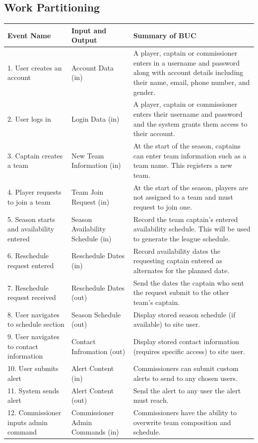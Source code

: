 \documentclass[12pt]{article}
\begin{document}
\subsection{Work Partitioning}
  \begin{center}
    \begin{tabular}{|m{4cm}|m{4cm}|m{6cm}|}
      \hline
      Event Name & Input and Output & Summary of BUC\\
      \hline
      1. User creates an account & Account Data (in) & A player, captain or
      commissioner enters in a username and password along with account details
      including their name, email, phone number, and gender.\\
      2. User logs in & Login Data (in) & A player, captain or commissioner
      enters their username and password and the system grants them access to
      their account.\\
      3. Captain creates a team & New Team Information (in) & At the
      start of the season, captains can enter team information such as a team
      name. This registers a new team.\\
      4. Player requests to join a team & Team Join Request (in) & At the
      start of the season, players are not assigned to a team and must request
      to join one.\\
      5. Season starts and availability entered & Season Availability Schedule
      (in) & Record the team captain's entered availability schedule. This
      will be used to generate the league schedule.\\
      6. Reschedule request entered & Reschedule Dates (in) & Record
      availability dates the requesting captain entered as alternates for the
      planned date.\\
      7. Reschedule request received & Reschedule Dates (out) & Send the dates
      the captain who sent the request submit to the other team's captain.\\
      8. User navigates to schedule section & Season Schedule (out) & Display
      stored season schedule (if available) to site user.\\
      9. User navigates to contact information & Contact Infromation (out) & Display
      stored contact information (requires specific access) to site user.\\
      10. User submits alert & Alert Content (in) & Commissioners can submit custom
      alerts to send to any chosen users.\\
      11. System sends alert & Alert Content (out) & Send the alert to any user the
      alert must reach.\\
      12. Commissioner inputs admin command & Commissioner Admin Commands (in)
      & Commissioners have the ability to overwrite team composition and
      schedule.\\
      \hline
    \end{tabular}
  \end{center}
\end{document}
